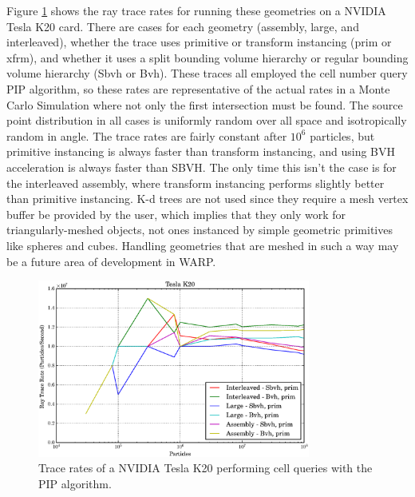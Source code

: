 Figure \ref{prelim_optix_k20} shows the ray trace rates for running these geometries on a NVIDIA Tesla K20 card.  There are cases for each geometry (assembly, large, and interleaved), whether the trace uses primitive or transform instancing (prim or xfrm), and whether it uses a split bounding volume hierarchy or regular bounding volume hierarchy (Sbvh or Bvh).  These traces all employed the cell number query PIP algorithm, so these rates are representative of the actual rates in a Monte Carlo Simulation where not only the first intersection must be found.  The source point distribution in all cases is uniformly random over all space and isotropically random in angle.  The trace rates are fairly constant after $10^6$ particles, but primitive instancing is always faster than transform instancing, and using BVH acceleration is always faster than SBVH.   The only time this isn't the case is for the interleaved assembly, where transform instancing performs slightly better than primitive instancing.  K-d trees are not used since they require a mesh vertex buffer be provided by the user, which implies that they only work for triangularly-meshed objects, not ones instanced by simple geometric primitives like spheres and cubes.  Handling geometries that are meshed in such a way may be a future area of development in WARP.

\begin{figure}[h!] 
  \centering
    \includegraphics[width=0.8\textwidth]{graphics/prelim_optix_k20.eps}
     \caption{Trace rates of a NVIDIA Tesla K20 performing cell queries with the PIP algorithm. \label{prelim_optix_k20} }
\end{figure}

